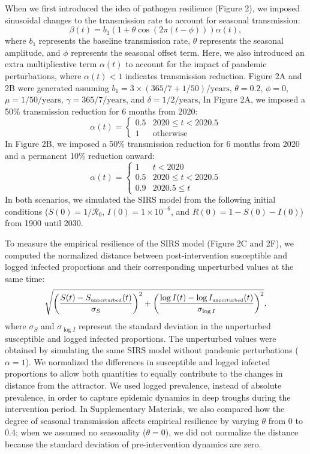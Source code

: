 \documentclass[12pt]{article}
\newcommand{\tsub}[2]{#1_{{\textrm{\tiny #2}}}}
\begin{document}
When we first introduced the idea of pathogen resilience (Figure 2), we imposed sinusoidal changes to the transmission rate to account for seasonal transmission:
\begin{equation}
\beta(t) = b_1 (1 + \theta \cos(2 \pi (t-\phi))) \alpha(t),
\end{equation}
where $b_1$ represents the baseline transmission rate, $\theta$ represents the seasonal amplitude, and $\phi$ represents the seasonal offset term.
Here, we also introduced an extra multiplicative term $\alpha(t)$ to account for the impact of pandemic perturbations, where $\alpha(t) < 1$ indicates transmission reduction.
Figure 2A and 2B were generated assuming $b_1 = 3 \times (365/7+1/50)/\mathrm{years}$, $\theta=0.2$, $\phi=0$, $\mu=1/50/\mathrm{years}$, $\gamma=365/7/\mathrm{years}$, and $\delta=1/2/\mathrm{years}$,
In Figure 2A, we imposed a 50\% transmission reduction for 6 months from 2020:
\begin{equation}
\alpha(t) = \begin{cases}
0.5 & 2020 \leq t< 2020.5\\
1 & \textrm{otherwise}
\end{cases}
\end{equation}
In Figure 2B, we imposed a 50\% transmission reduction for 6 months from 2020 and a permanent 10\% reduction onward:
\begin{equation}
\alpha(t) = \begin{cases}
1 & t < 2020\\
0.5 & 2020 \leq t < 2020.5\\
0.9 & 2020.5 \leq t
\end{cases}
\end{equation}
In both scenarios, we simulated the SIRS model from the following initial conditions ($S(0) = 1/\mathcal R_0$, $I(0) = 1\times 10^{-6}$, and $R(0) = 1 - S(0) - I(0)$) from 1900 until 2030.

To measure the empirical resilience of the SIRS model (Figure 2C and 2F), we computed the normalized distance between post-intervention susceptible and logged infected proportions and their corresponding unperturbed values at the same time:
\begin{equation}
\sqrt{\left(\frac{S(t) - \tsub{S}{unperturbed}(t)}{\sigma_S}\right)^2 + \left(\frac{\log I(t) - \log \tsub{I}{unperturbed}(t)}{\sigma_{\log I}}\right)^2},
\end{equation}
where $\sigma_S$ and $\sigma_{\log I}$ represent the standard deviation in the unperturbed susceptible and logged infected proportions.
The unperturbed values were obtained by simulating the same SIRS model without pandemic perturbations ($\alpha = 1$).
We normalized the differences in susceptible and logged infected proportions to allow both quantities to equally contribute to the changes in distance from the attractor.
We used logged prevalence, instead of absolute prevalence, in order to capture epidemic dynamics in deep troughs during the intervention period.
In Supplementary Materials, we also compared how the degree of seasonal transmission affects empirical resilience by varying $\theta$ from 0 to 0.4; when we assumed no seasonality ($\theta = 0$), we did not normalize the distance because the standard deviation of pre-intervention dynamics are zero. 
\end{document}
